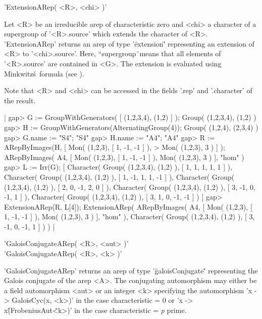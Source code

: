 
'ExtensionARep( <R>, <chi> )'

Let <R> be an irreducible arep of characteristic zero and <chi> a 
character of a supergroup of '<R>.source' which extends the 
character of <R>. 'ExtensionARep' returns an arep of type 
'\"extension\"' representing an extension of <R> to 
'<chi>.source'. Here, ``supergroup\"\ means 
that all elements of '<R>.source' are contained in <G>.
The extension is evaluated using Minkwitz\'s\ formula 
(see \cite{Min96}).

Note that <R> and <chi> can be accessed in the fields 
'.rep' and '.character' of the result.

|    gap> G := GroupWithGenerators( [ (1,2,3,4), (1,2) ] );
    Group( (1,2,3,4), (1,2) )
    gap> H := GroupWithGenerators(AlternatingGroup(4));
    Group( (1,2,4), (2,3,4) )
    gap> G.name := "S4";
    "S4"
    gap> H.name := "A4";
    "A4"
    gap> R := ARepByImages(H, [ Mon( (1,2,3), [ 1, -1, -1 ] ),
    > Mon( (1,2,3), 3 ) ] );
    ARepByImages(
      A4,
      [ Mon( (1,2,3), [ 1, -1, -1 ] ),
        Mon( (1,2,3), 3 )
      ],
      "hom"
    )
    gap> L := Irr(G);
    [ Character( Group( (1,2,3,4), (1,2) ), [ 1, 1, 1, 1, 1 ] ), 
      Character( Group( (1,2,3,4), (1,2) ), [ 1, -1, 1, 1, -1 ] ), 
      Character( Group( (1,2,3,4), (1,2) ), [ 2, 0, -1, 2, 0 ] ), 
      Character( Group( (1,2,3,4), (1,2) ), [ 3, -1, 0, -1, 1 ] ), 
      Character( Group( (1,2,3,4), (1,2) ), [ 3, 1, 0, -1, -1 ] ) ]
    gap> ExtensionARep(R, L[4]);
    ExtensionARep(
      ARepByImages(
        A4,
        [ Mon(
            (1,2,3),
            [ 1, -1, -1 ]
          ),
          Mon( (1,2,3), 3 )
        ],
        "hom"
      ),
      Character( Group( (1,2,3,4), (1,2) ), [ 3, -1, 0, -1, 1 ] )
    ) |


'GaloisConjugateARep( <R>, <aut> )'\\
'GaloisConjugateARep( <R>, <k> )'

'GaloisConjugateARep' returns an arep of type '\"galoisConjugate\"' 
representing the Galois conjugate of the arep <A>.
The conjugating automorphism may either be a field automorphism <aut>
or an integer <k> specifying the automorphism 'x -> GaloisCyc(x, <k>)'
in the case characteristic = 0 or 'x -> x\^(FrobeniusAut\^<k>)' 
in the case characteristic = $p$ prime.

